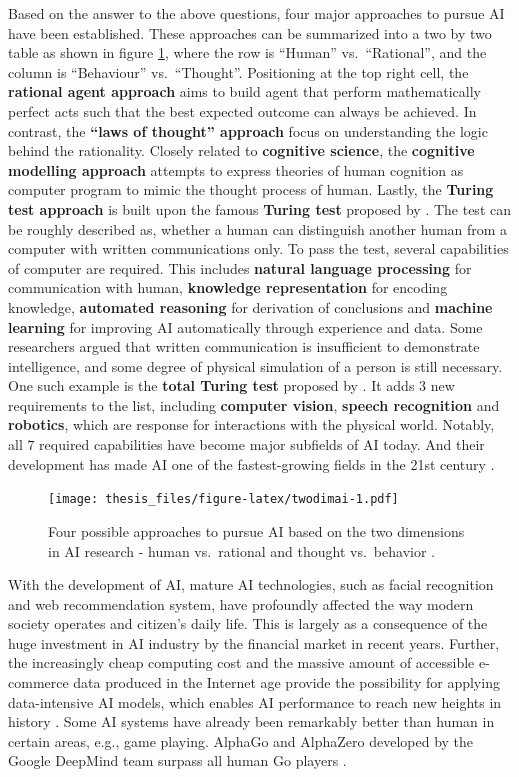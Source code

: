 \documentclass{monashthesis}
\begin{document}
Based on the answer to the above questions, four major approaches to pursue AI have been established. These approaches can be summarized into a two by two table as shown in figure \ref{fig:twodimai}, where the row is ``Human'' vs.~``Rational'', and the column is ``Behaviour'' vs.~``Thought''. Positioning at the top right cell, the \textbf{rational agent approach} aims to build agent that perform mathematically perfect acts such that the best expected outcome can always be achieved. In contrast, the \textbf{``laws of thought'' approach} focus on understanding the logic behind the rationality. Closely related to \textbf{cognitive science}, the \textbf{cognitive modelling approach} attempts to express theories of human cognition as computer program to mimic the thought process of human. Lastly, the \textbf{Turing test approach} is built upon the famous \textbf{Turing test} proposed by \textcite{turing_computing_1950}. The test can be roughly described as, whether a human can distinguish another human from a computer with written communications only. To pass the test, several capabilities of computer are required. This includes \textbf{natural language processing} for communication with human, \textbf{knowledge representation} for encoding knowledge, \textbf{automated reasoning} for derivation of conclusions and \textbf{machine learning} for improving AI automatically through experience and data. Some researchers argued that written communication is insufficient to demonstrate intelligence, and some degree of physical simulation of a person is still necessary. One such example is the \textbf{total Turing test} proposed by \textcite{harnad_other_1991}. It adds \(3\) new requirements to the list, including \textbf{computer vision}, \textbf{speech recognition} and \textbf{robotics}, which are response for interactions with the physical world. Notably, all \(7\) required capabilities have become major subfields of AI today. And their development has made AI one of the fastest-growing fields in the 21st century \autocite{russell_artificial_2002}.

\begin{figure}
\centering
\texttt{[image: thesis\_files/figure-latex/twodimai-1.pdf]}
\caption{\label{fig:twodimai}Four possible approaches to pursue AI based on the two dimensions in AI research - human vs.~rational and thought vs.~behavior \autocite{russell_artificial_2002}.}
\end{figure}

With the development of AI, mature AI technologies, such as facial recognition and web recommendation system, have profoundly affected the way modern society operates and citizen's daily life. This is largely as a consequence of the huge investment in AI industry by the financial market in recent years. Further, the increasingly cheap computing cost and the massive amount of accessible e-commerce data produced in the Internet age provide the possibility for applying data-intensive AI models, which enables AI performance to reach new heights in history \autocite{jordan_machine_2015}. Some AI systems have already been remarkably better than human in certain areas, e.g., game playing. AlphaGo and AlphaZero developed by the Google DeepMind team surpass all human Go players \autocite{silver_general_2018}.
\end{document}
